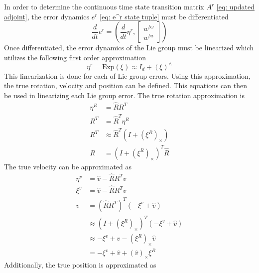 In order to determine the continuous time state transition matrix $A^r$ \eqref{eq: updated adjoint}, the error dynamics $e^r$ \eqref{eq: e^r state tuple} must be differentiated
\begin{equation}
    \frac{d}{dt} e^r = (\frac{d}{dt} \eta^r, \begin{bmatrix}
        w^{b \omega} \\
        w^{b a}
    \end{bmatrix})
    \label{eq: e derivative}
\end{equation}
Once differentiated, the error dynamics of the Lie group must be linearized which utilizes the following first order approximation 
\begin{equation}
    \eta^r = \text{Exp}(\xi) \approx I_d + (\xi)^{\wedge}
    \label{eq: eta first order approx}
\end{equation}
This linearization is done for each of Lie group errors. Using this approximation, the true rotation, velocity and position can be defined. This equations can then be used in linearizing each Lie group error. The true rotation approximation is
\begin{equation}
    \begin{split}
        \eta^R &= \hat{R} R^T  \\
        R^T  &= \hat{R}^T \eta^R \\
        R^T & \approx \hat{R}^T (I + (\xi^R)_{\times})\\
        R &= (I + (\xi^R)_{\times})^T \hat{R}
        \label{eq: approx true R InEKF}
    \end{split}
\end{equation}
The true velocity can be approximated as
\begin{equation}
    \begin{split}
        \eta^v & = \hat{v} - \hat{R} R^T v \\ 
        \xi^v & = \hat{v} - \hat{R} R^T v \\ 
        v &= (\hat{R} R^T)^T (-\xi^v + \hat{v}) \\
        & \approx (I + (\xi^R)_{\times})^T (-\xi^v + \hat{v}) \\
        & \approx -\xi^v + \hat{v} - (\xi^R)_{\times} \hat{v} \\
        & = -\xi^v + \hat{v} + (\hat{v})_{\times} \xi^R
        \label{eq: approx true v InEKF}        
    \end{split}
\end{equation}
Additionally, the true position is approximated as
